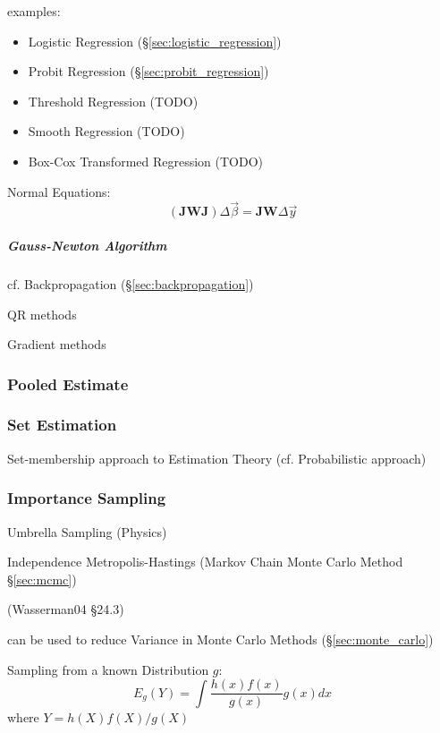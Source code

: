 examples:
\begin{itemize}
  \item Logistic Regression (\S\ref{sec:logistic_regression})
  \item Probit Regression (\S\ref{sec:probit_regression})
  \item Threshold Regression (TODO)
  \item Smooth Regression (TODO)
  \item Box-Cox Transformed Regression (TODO)
\end{itemize}

Normal Equations:
\[
  (\mathbf{J} \mathbf{W J}) \Delta \vec{\beta} =
    \mathbf{J} \mathbf{W} \Delta \vec{y}
\]



\subparagraph{Gauss-Newton Algorithm}\label{sec:gauss_newton}\hfill

cf. Backpropagation (\S\ref{sec:backpropagation})

QR methods

Gradient methods



\subsubsection{Pooled Estimate}\label{sec:pooled_estimate}




\subsubsection{Set Estimation}\label{sec:set_estimation}

Set-membership approach to Estimation Theory (cf. Probabilistic approach)



\subsubsection{Importance Sampling}\label{sec:importance_sampling}

Umbrella Sampling (Physics)

\fist Independence Metropolis-Hastings (Markov Chain Monte Carlo Method
\S\ref{sec:mcmc})

(Wasserman04 \S24.3)

can be used to reduce Variance in Monte Carlo Methods (\S\ref{sec:monte_carlo})

Sampling from a known Distribution $g$:
\[
  E_g(Y) = \int \frac{h(x)f(x)}{g(x)} g(x) dx
\]
where $Y = h(X)f(X)/g(X)$

